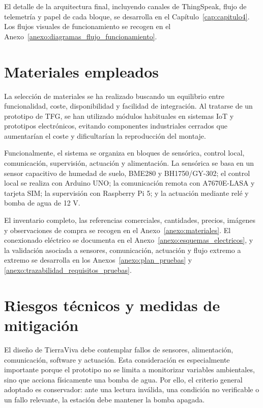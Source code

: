 El detalle de la arquitectura final, incluyendo canales de ThingSpeak, flujo de telemetría y papel de cada bloque, se desarrolla en el Capítulo~\ref{cap:capitulo4}. Los flujos visuales de funcionamiento se recogen en el Anexo~\ref{anexo:diagramas_flujo_funcionamiento}.

\section{Materiales empleados}
\label{sec:materiales_empleados}

La selección de materiales se ha realizado buscando un equilibrio entre funcionalidad, coste, disponibilidad y facilidad de integración. Al tratarse de un prototipo de TFG, se han utilizado módulos habituales en sistemas IoT y prototipos electrónicos, evitando componentes industriales cerrados que aumentarían el coste y dificultarían la reproducción del montaje.

Funcionalmente, el sistema se organiza en bloques de sensórica, control local, comunicación, supervisión, actuación y alimentación. La sensórica se basa en un sensor capacitivo de humedad de suelo, BME280 y BH1750/GY-302; el control local se realiza con Arduino UNO; la comunicación remota con A7670E-LASA y tarjeta SIM; la supervisión con Raspberry Pi 5; y la actuación mediante relé y bomba de agua de 12 V.

El inventario completo, las referencias comerciales, cantidades, precios, imágenes y observaciones de compra se recogen en el Anexo~\ref{anexo:materiales}. El conexionado eléctrico se documenta en el Anexo~\ref{anexo:esquemas_electricos}, y la validación asociada a sensores, comunicación, actuación y flujo extremo a extremo se desarrolla en los Anexos~\ref{anexo:plan_pruebas} y \ref{anexo:trazabilidad_requisitos_pruebas}.

\section{Riesgos técnicos y medidas de mitigación}
\label{sec:riesgos_tecnicos_mitigacion}

El diseño de TierraViva debe contemplar fallos de sensores, alimentación, comunicación, software y actuación. Esta consideración es especialmente importante porque el prototipo no se limita a monitorizar variables ambientales, sino que acciona físicamente una bomba de agua. Por ello, el criterio general adoptado es conservador: ante una lectura inválida, una condición no verificable o un fallo relevante, la estación debe mantener la bomba apagada.

